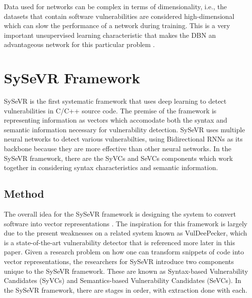 \documentclass[12pt,twocolumn,letterpaper]{article}
\begin{document}
Data used for networks can be complex in terms of dimensionality, i.e., the datasets that contain software 
vulnerabilities are considered high-dimensional which can slow the performance of a network during training. 
This is a very important unsupervised learning characteristic that makes the DBN an advantageous network 
for this particular problem \cite{Lin20}.

\section{SySeVR Framework}
\label{sec:sysevr-framework}
SySeVR is the first systematic framework that uses deep learning to detect vulnerabilities in C/C++ source code. The premise of the framework is representing information as vectors which
accomodate both the syntax and semantic information necessary for vulnerability detection. SySeVR uses multiple neural networks to detect various vulnerabilties, using Bidirectional RNNs as its backbone because they are more effective than other neural networks.
In the SySeVR framework, there are the SyVCs and SeVCs components which work together in considering syntax characteristics and semantic information.

\subsection{Method}
\label{sub:method}
The overall idea for the SySeVR framework is designing the system to convert software into vector representations \cite{Li22}.
The inspiration for this framework is largely due to the present weaknesses on a related system known as VulDeePecker, which is a state-of-the-art vulnerability detector that is referenced
more later in this paper. Given a research problem on how one can transform snippets of code into vector representations, the researchers for SySeVR introduce two
components unique to the SySeVR framework. These are known as Syntax-based Vulnerability Candidates (SyVCs) and Semantics-based Vulnerability Candidates (SeVCs). In the SySeVR framework, there are 
stages in order, with extraction done with each.
\end{document}
